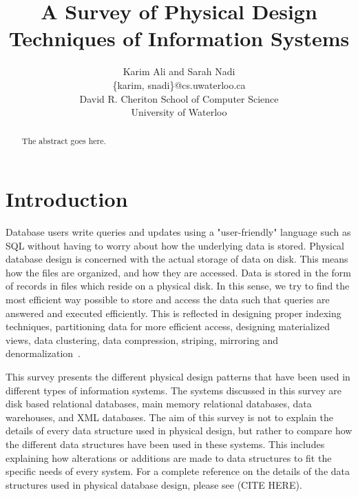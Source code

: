 \documentclass[12pt,a4paper]{article}
\begin{document}
%
\title{A Survey of Physical Design Techniques of Information Systems}



\author{Karim Ali and Sarah Nadi\\
\{karim, snadi\}@cs.uwaterloo.ca \\
David R. Cheriton School of Computer Science\\
University of Waterloo\\
}


\maketitle


\begin{abstract}
The abstract goes here.
\end{abstract}

\section{Introduction}

Database users write queries and updates using a "user-friendly" language such as SQL without having to worry about how the underlying data is stored. Physical database design is concerned with the actual storage of data on disk. This means how the files are organized, and how they are accessed. Data is stored in the form of records in files which reside on a physical disk. In this sense, we try to find the most efficient way possible to store and access the data such that queries are answered and executed efficiently. This is reflected in designing proper indexing techniques, partitioning data for more efficient access, designing materialized views, data clustering, data compression, striping, mirroring and denormalization~\cite{lightstone2007physical}. 

This survey presents the different physical design patterns that have been used in different types of information systems. The systems discussed in this survey are disk based relational databases, main memory relational databases, data warehouses, and XML databases. The aim of this survey is not to explain the details of every data structure used in physical design, but rather to compare how the different data structures have been used in these systems. This includes explaining how alterations or additions are made to data structures to fit the specific needs of every system. For a complete reference on the details of the data structures used in physical database design, please see (CITE HERE). 
\end{document}
